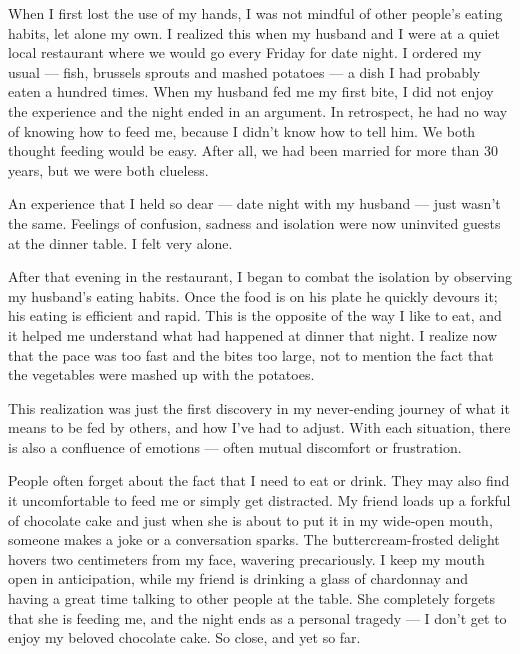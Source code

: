 When I first lost the use of my hands, I was not mindful of other
people's eating habits, let alone my own. I realized this when my
husband and I were at a quiet local restaurant where we would go every
Friday for date night. I ordered my usual --- fish, brussels sprouts and
mashed potatoes --- a dish I had probably eaten a hundred times. When my
husband fed me my first bite, I did not enjoy the experience and the
night ended in an argument. In retrospect, he had no way of knowing how
to feed me, because I didn't know how to tell him. We both thought
feeding would be easy. After all, we had been married for more than 30
years, but we were both clueless.

An experience that I held so dear --- date night with my husband ---
just wasn't the same. Feelings of confusion, sadness and isolation were
now uninvited guests at the dinner table. I felt very alone.

After that evening in the restaurant, I began to combat the isolation by
observing my husband's eating habits. Once the food is on his plate he
quickly devours it; his eating is efficient and rapid. This is the
opposite of the way I like to eat, and it helped me understand what had
happened at dinner that night. I realize now that the pace was too fast
and the bites too large, not to mention the fact that the vegetables
were mashed up with the potatoes.

This realization was just the first discovery in my never-ending journey
of what it means to be fed by others, and how I've had to adjust. With
each situation, there is also a confluence of emotions --- often mutual
discomfort or frustration.

People often forget about the fact that I need to eat or drink. They may
also find it uncomfortable to feed me or simply get distracted. My
friend loads up a forkful of chocolate cake and just when she is about
to put it in my wide-open mouth, someone makes a joke or a conversation
sparks. The buttercream-frosted delight hovers two centimeters from my
face, wavering precariously. I keep my mouth open in anticipation, while
my friend is drinking a glass of chardonnay and having a great time
talking to other people at the table. She completely forgets that she is
feeding me, and the night ends as a personal tragedy --- I don't get to
enjoy my beloved chocolate cake. So close, and yet so far.

